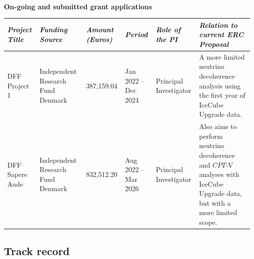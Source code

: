 \documentclass[a4paper,11pt]{article}
\begin{document}
~\vspace{2cm}


{\bf On-going and submitted grant applications}
\begin{table}[h]
\centering
\begin{tabularx}{1\textwidth}{|C{0.125\textwidth}|C{0.125\textwidth}|C{0.1\textwidth}|C{0.115\textwidth}|C{0.115\textwidth}|C{0.26\textwidth}|}
\hline
{} \it  Project Title & \it Funding Source & \it Amount (Euros) & \it Period & \it Role of the PI & \it Relation to current ERC Proposal\\
\hline
DFF Project 1 & Independent Research Fund Denmark & 387,159.04 & Jan 2022 -- Dec 2024 & Principal Investigator & A more limited neutrino decoherence analysis using the first year of IceCube Upgrade data. \\
\hline
DFF Sapere Aude & Independent Research Fund Denmark & 832,512.20 & Aug 2022 -- Mar 2026 & Principal Investigator & Also aims to perform neutrino decoherence and $CPT$-V analyses with IceCube Upgrade data, but with a more limited scope. \\
\hline
\end{tabularx}
\end{table}


\newpage

\subsection{Track record}

\vspace{0.2cm}

\end{document}
